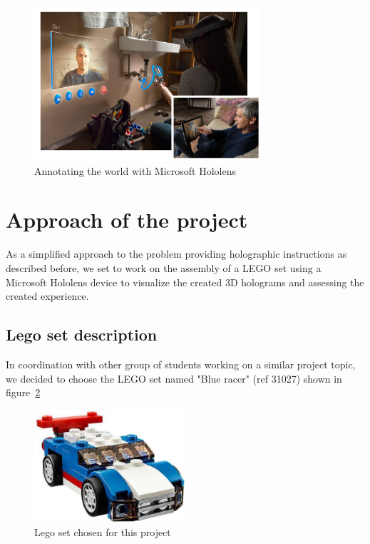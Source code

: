 \begin{figure}
    \centering
    \includegraphics[width=0.75\textwidth]{Annotating_world_hololens}
    \caption{Annotating the world with Microsoft Hololens}
    \label{AnnotatingTheWorld}
\end{figure}

\section{Approach of the project}
As a simplified approach to the problem providing holographic instructions as described before, we set to work on the assembly of a LEGO set using a Microsoft Hololens device to visualize the created 3D holograms and assessing the created experience.

\subsection{Lego set description} %
In coordination with other group of students working on a similar project topic, we decided to choose the LEGO set named "Blue racer" (ref 31027) shown in figure~\ref{BlueRacer}
\begin{figure}
    \centering
    \includegraphics[width=0.5\textwidth]{BlueRacer}
    \caption{Lego set chosen for this project}
    \label{BlueRacer}
\end{figure}

